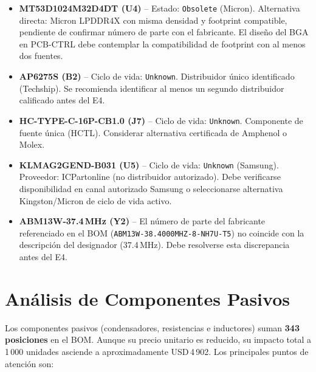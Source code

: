 \begin{riskbox}
  \begin{itemize}
    \item \textbf{MT53D1024M32D4DT (U4)} -- Estado: \texttt{Obsolete}
      (Micron). Alternativa directa: Micron LPDDR4X con misma densidad
      y footprint compatible, pendiente de confirmar número de parte con
      el fabricante. El diseño del BGA en PCB-CTRL debe contemplar la
      compatibilidad de footprint con al menos dos fuentes.
    \item \textbf{AP6275S (B2)} -- Ciclo de vida: \texttt{Unknown}.
      Distribuidor único identificado (Techship). Se recomienda identificar
      al menos un segundo distribuidor calificado antes del E4.
    \item \textbf{HC-TYPE-C-16P-CB1.0 (J7)} -- Ciclo de vida:
      \texttt{Unknown}. Componente de fuente única (HCTL). Considerar
      alternativa certificada de Amphenol o Molex.
    \item \textbf{KLMAG2GEND-B031 (U5)} -- Ciclo de vida: \texttt{Unknown}
      (Samsung). Proveedor: ICPartonline (no distribuidor autorizado).
      Debe verificarse disponibilidad en canal autorizado Samsung o
      seleccionarse alternativa Kingston/Micron de ciclo de vida activo.
    \item \textbf{ABM13W-37.4\,MHz (Y2)} -- El número de parte del
      fabricante referenciado en el BOM (\texttt{ABM13W-38.4000MHZ-8-NH7U-T5})
      no coincide con la descripción del designador (37.4\,MHz). Debe
      resolverse esta discrepancia antes del E4.
  \end{itemize}
\end{riskbox}

\section{Análisis de Componentes Pasivos}
\label{sec:bom_pasivos}

Los componentes pasivos (condensadores, resistencias e inductores) suman
\textbf{343 posiciones} en el BOM. Aunque su precio unitario es reducido,
su impacto total a 1\,000 unidades asciende a aproximadamente
USD\,4\,902. Los principales puntos de atención son:

